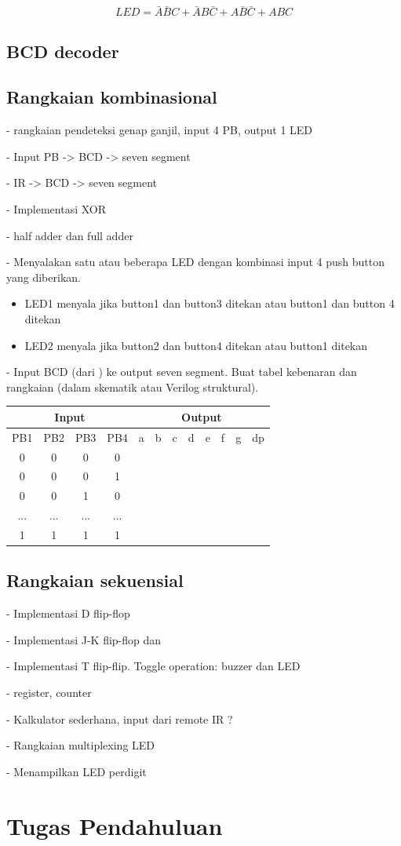 \documentclass[a4paper,11pt,bahasa]{extarticle}
\begin{document}
\begin{equation*}
LED = \bar{A}\bar{B}C + \bar{A}B\bar{C} + A\bar{B}\bar{C} + ABC
\end{equation*}

\subsection{BCD decoder}


\subsection{Rangkaian kombinasional}

- rangkaian pendeteksi genap ganjil, input 4 PB, output 1 LED

- Input PB -> BCD -> seven segment

- IR -> BCD -> seven segment

- Implementasi XOR

- half adder dan full adder

- Menyalakan satu atau beberapa LED dengan kombinasi input
4 push button yang diberikan.
\begin{itemize}
\item LED1 menyala jika button1 dan button3 ditekan atau button1 dan button 4 ditekan
\item LED2 menyala jika button2 dan button4 ditekan atau button1 ditekan
\end{itemize}

- Input BCD (dari ) ke output seven segment. Buat tabel kebenaran dan rangkaian (dalam skematik
atau Verilog struktural).

{\centering
\begin{tabular}{|c|c|c|c||c|c|c|c|c|c|c|c|}
\hline
\multicolumn{4}{|c||}{Input} & \multicolumn{8}{|c|}{Output} \\
\hline
PB1 & PB2 & PB3 & PB4 & a & b & c & d & e & f & g & dp \\
\hline
0 & 0 & 0 & 0 &  &  &  &  &  &  &  & \\
0 & 0 & 0 & 1 &  &  &  &  &  &  &  & \\
0 & 0 & 1 & 0 &  &  &  &  &  &  &  & \\
... & ... & ... & ... &  &  &  &  &  &  &  & \\
1 & 1 & 1 & 1 &  &  &  &  &  &  &  & \\
\hline
\end{tabular}
\par}


\subsection{Rangkaian sekuensial}

- Implementasi D flip-flop

- Implementasi J-K flip-flop dan

- Implementasi T flip-flip. Toggle operation: buzzer dan LED

- register, counter

- Kalkulator sederhana, input dari remote IR ?

- Rangkaian multiplexing LED

- Menampilkan LED perdigit


\section{Tugas Pendahuluan}
\end{document}
